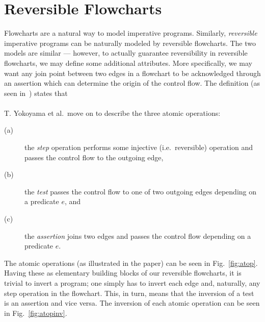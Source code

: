 
\section{Reversible Flowcharts}
Flowcharts are a natural way to model imperative programs. Similarly, \textit{reversible} imperative programs can be naturally modeled by reversible flowcharts. The two models are similar --- however, to actually guarantee reversibility in reversible flowcharts, we may define some additional attributes. More specifically, we may want any join point between two edges in a flowchart to be acknowledged through an assertion which can determine the origin of the control flow. The definition (as seen in~\cite[p.~89]{REV}) states that \\

 \\

\noindent T. Yokoyama et al.\ move on to describe the three atomic operations:
\begin{description}
  \item[(a)] the \textit{step} operation performs some injective (i.e.\ reversible) operation and passes the control flow to the outgoing edge,
  \item[(b)] the \textit{test} passes the control flow to one of two outgoing edges depending on a predicate $e$, and
  \item[(c)] the \textit{assertion} joins two edges and passes the control flow depending on a predicate $e$.
\end{description}
\noindent The atomic operations (as illustrated in the paper) can be seen in Fig.~\ref{fig:atop}. Having these as elementary building blocks of our reversible flowcharts, it is trivial to invert a program; one simply has to invert each edge and, naturally, any step operation in the flowchart. This, in turn, means that the inversion of a test is an assertion and vice versa. The inversion of each atomic operation can be seen in Fig.~\ref{fig:atopinv}.

